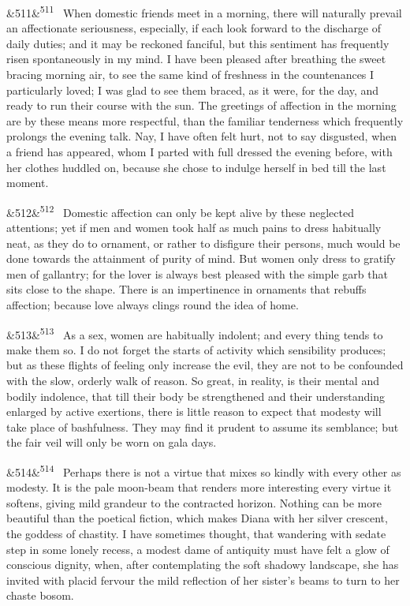\documentclass[12pt]{article}
\newcommand{\para}[1][]{\par\noindent\ifx&#1&\else\textsuperscript{\footnotesize #1}~\fi}
\begin{document}
\para[511] When domestic friends meet in a morning, there will naturally prevail an affectionate seriousness, especially, if each look forward to the discharge of daily duties; and it may be reckoned fanciful, but this sentiment has frequently risen spontaneously in my mind. I have been pleased after breathing the sweet bracing morning air, to see the same kind of freshness in the countenances I particularly loved; I was glad to see them braced, as it were, for the day, and ready to run their course with the sun. The greetings of affection in the morning are by these means more respectful, than the familiar tenderness which frequently prolongs the evening talk. Nay, I have often felt hurt, not to say disgusted, when a friend has appeared, whom I parted with full dressed the evening before, with her clothes huddled on, because she chose to indulge herself in bed till the last moment.

\para[512] Domestic affection can only be kept alive by these neglected attentions; yet if men and women took half as much pains to dress habitually neat, as they do to ornament, or rather to disfigure their persons, much would be done towards the attainment of purity of mind. But women only dress to gratify men of gallantry; for the lover is always best pleased with the simple garb that sits close to the shape. There is an impertinence in ornaments that rebuffs affection; because love always clings round the idea of home.

\para[513] As a sex, women are habitually indolent; and every thing tends to make them so. I do not forget the starts of activity which sensibility produces; but as these flights of feeling only increase the evil, they are not to be confounded with the slow, orderly walk of reason. So great, in reality, is their mental and bodily indolence, that till their body be strengthened and their understanding enlarged by active exertions, there is little reason to expect that modesty will take place of bashfulness. They may find it prudent to assume its semblance; but the fair veil will only be worn on gala days.

\para[514] Perhaps there is not a virtue that mixes so kindly with every other as modesty. It is the pale moon-beam that renders more interesting every virtue it softens, giving mild grandeur to the contracted horizon. Nothing can be more beautiful than the poetical fiction, which makes Diana with her silver crescent, the goddess of chastity. I have sometimes thought, that wandering with sedate step in some lonely recess, a modest dame of antiquity must have felt a glow of conscious dignity, when, after contemplating the soft shadowy landscape, she has invited with placid fervour the mild reflection of her sister's beams to turn to her chaste bosom.
\end{document}
